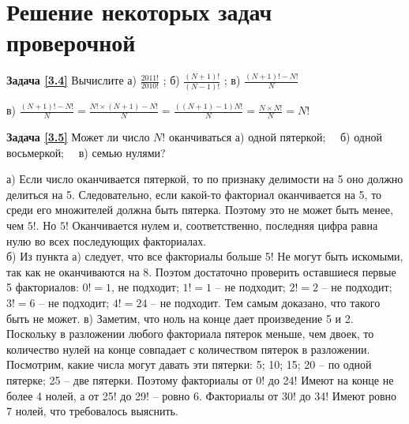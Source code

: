 \section{Решение некоторых задач проверочной}

\textbf{Задача \ref{3.4}}
	Вычислите а) $\frac{2011!}{2010!}$ ;  б) $\frac{(N+1)!}{(N-1)!}$ ; в)  $\frac{(N+1)!-N!}{N}$

\begin{prf}
	в) $\frac{(N+1)!-N!}{N}=\frac{N!\times (N+1)-N!}{N}=\frac{((N+1)-1)N!}{N}=\frac{N\times N!}{N}=N! $
\end{prf}

\textbf{Задача \ref{3.5}}
	Может ли число $N!$ оканчиваться а) одной пятеркой;~~ б) одной восьмеркой;~~ в) семью нулями?

\begin{prf}
	а) Если число оканчивается пятеркой, то по признаку делимости на 5 оно должно делиться на 5. Следовательно, если какой-то факториал оканчивается на 5, то среди его множителей должна быть пятерка. Поэтому это не может быть менее, чем $ 5! $. Но $ 5! $ Оканчивается нулем и, соответственно, последняя цифра равна нулю во всех последующих факториалах.\\  б) Из пункта а) следует, что все факториалы больше 5! Не могут быть искомыми, так как не оканчиваются на 8. Поэтом достаточно проверить оставшиеся первые 5 факториалов: $ 0! = 1 $, не подходит; $ 1! = 1 $ – не подходит; $ 2! = 2 $ – не подходит; $ 3! = 6 $ – не подходит; $ 4! = 24 $ – не подходит. Тем самым доказано, что такого быть не может. в) Заметим, что ноль на конце дает произведение 5 и 2. Поскольку в разложении любого факториала пятерок меньше, чем двоек, то количество нулей на конце совпадает с количеством пятерок в разложении. Посмотрим, какие числа могут давать эти пятерки: 5; 10; 15; 20 – по одной пятерке; 25 – две пятерки. Поэтому факториалы от 0! до 24! Имеют на конце не более 4 нолей, а от 25! до 29! – ровно 6. Факториалы от 30! до 34! Имеют ровно 7 нолей, что требовалось выяснить.
\end{prf}